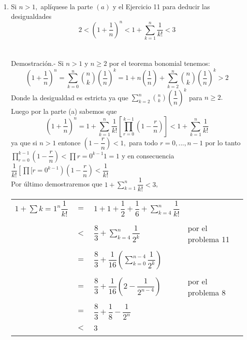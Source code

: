 \begin{enumerate}[ \bfseries 1.]
\begin{enumerate}[\bfseries (a)]
\item Si $n>1,$ aplíquese la parte $(a)$ y el Ejercicio 11 para deducir las desigualdades 
$$2 < \left( 1 + \dfrac{1}{n} \right)^n < 1 + \displaystyle\sum_{k=1}^n \dfrac{1}{k!} < 3 $$ \\\\
Demostración.- \; Si $n>1$ y $n\geq 2$ por el teorema bonomial tenemos:
$$\left( 1 + \dfrac{1}{n} \right)^n = \sum\limits_{k=0}^n {n \choose k} \left( \dfrac{1}{n} \right) ^k = 1 + n\left( \dfrac{1}{n} \right) + \sum\limits_{k=2}^n {n \choose k} \left( \dfrac{1}{n} \right)^k > 2$$
Donde la desigualdad es estricta ya que $\sum\limits_{k=2}^n {n \choose k} \left( \dfrac{1}{n} \right)^k $ para $n \geq 2.$\\
Luego por la parte (a) sabemos que $$\left( 1 + \dfrac{1}{n} \right) ^n = 1 + \sum\limits_{k=1}^n \dfrac{1}{k!} \left[ \prod\limits_{r=0}^{k-1} \left( 1 - \dfrac{r}{n} \right) \right] < 1 + \sum\limits_{k=1}^n \dfrac{1}{k!}$$
ya que si $n>1$ entonce $\left( 1 - \dfrac{r}{n} \right) < 1,$ para todo $ r = 0,...,n-1$ por lo tanto $\prod\limits_{r=0}^{k-1} \left( 1 - \dfrac{r}{n} \right) < \prod\limits{r=0}^{k-1} 1 = 1$ y en consecuencia $\dfrac{1}{k!} \left[ \prod\limits[{r=0}^{k-1} \right) \left( 1 - \dfrac{r}{n} \right) < \dfrac{1}{k!}$\\
Por último demostraremos que $1+ \sum\limits_{k=1}^n \dfrac{1}{k!} < 3$, 
\begin{center}
\begin{tabular}{rcll}
$1 + \sum\limits{k=1}^n \dfrac{1}{k!}$&$=$&$1+ 1 +\dfrac{1}{2} + \dfrac{1}{6} + \sum\limits_{k=4}^n \dfrac{1}{k!}$&\\\\
&$<$&$\dfrac{8}{3} + \sum\limits_{k=4}^n \dfrac{1}{2^k}$&por el problema 11\\\\
&$=$&$\dfrac{8}{3} + \dfrac{1}{16} \left( \sum\limits_{k=0}^{n-4} \dfrac{1}{2^k} \right)$&\\\\
&$=$&$\dfrac{8}{3} + \dfrac{1}{16} \left( 2 - \dfrac{1}{2^{n-4}} \right)$&por el problema 8\\\\
&$=$&$\dfrac{8}{3} + \dfrac{1}{8} - \dfrac{1}{2^n} $&\\\\
&$<$&$3$&\\\\
\end{tabular}
\end{center}
\end{enumerate}


\end{enumerate}
